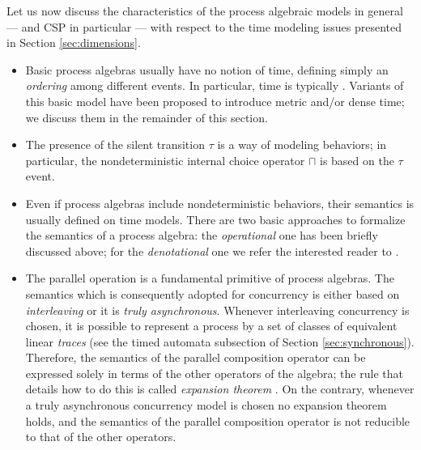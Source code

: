 Let us now discuss the characteristics of the process algebraic 
models in general --- and CSP in particular --- with respect to 
the time modeling issues presented in Section \ref{sec:dimensions}. 

\begin{itemize}
\item Basic process algebras usually have no  notion of 
time, defining simply an \emph{ordering} among different events. 
In particular, time is typically  \cite{Bae04}. Variants 
of this basic model have been proposed to introduce metric and/or 
dense time; we discuss them in the remainder of this section.

\item The presence of the silent transition $\tau$ is a way of modeling 
 behaviors; in particular, the nondeterministic internal 
choice operator $\sqcap$ is based on the $\tau$ event.

\item Even if process algebras include nondeterministic behaviors, 
their semantics is usually defined on  time models. 
There are two basic approaches to formalize the semantics of 
a process algebra: the \emph{operational} one has been briefly discussed 
above; for the \emph{denotational} one we refer the interested reader 
to \cite{Sch00}.

\item The parallel  operation is a fundamental primitive 
of process algebras. The semantics which is consequently adopted 
for concurrency is either based on \emph{interleaving} or it is \emph{truly asynchronous}.
Whenever interleaving concurrency is chosen, it 
is possible to represent a process by a set of classes of equivalent 
linear \emph{traces} (see the timed automata subsection of Section \ref{sec:synchronous}). 
Therefore, the semantics of the parallel composition operator 
can be expressed solely in terms of the other operators of the 
algebra; the rule that details how to do this is called \emph{expansion theorem} \cite{Bae04}.
On the contrary, whenever a truly asynchronous 
concurrency model is chosen no expansion theorem holds, and the 
semantics of the parallel composition operator is not reducible 
to that of the other operators.




\end{itemize}

